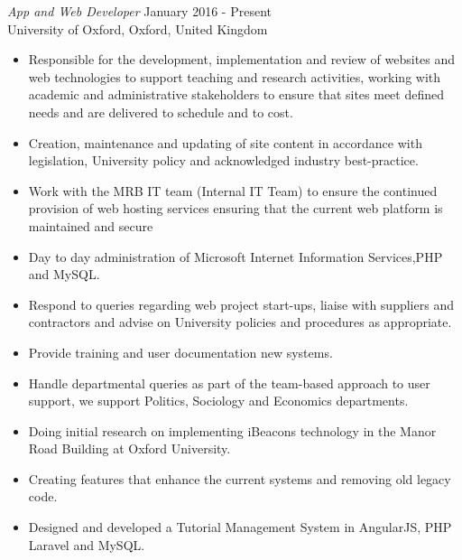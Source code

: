 \documentclass[margin, 10pt]{res} %
\begin{document}
\begin{resume}
{\sl App and Web Developer} \hfill January 2016 - Present \\
University of Oxford, Oxford, United Kingdom
\vspace{5mm} %
\begin{itemize} \itemsep -2pt %
\item Responsible for the development, implementation and review of websites and web technologies to support teaching and research activities, working with academic and administrative stakeholders to ensure that sites meet defined needs and are delivered to schedule and to cost.
\item Creation, maintenance and updating of site content in accordance with legislation, University policy and acknowledged industry best-practice.
\item Work with the MRB IT team (Internal IT Team) to ensure the continued provision of web hosting services ensuring that the current web platform is maintained and secure
\item Day to day administration of Microsoft Internet Information Services,PHP and MySQL.
\item Respond to queries regarding web project start-ups, liaise with suppliers and contractors and advise on University policies and procedures as appropriate.
\item Provide training and user documentation new systems.
\item Handle departmental queries as part of the team-based approach to user support, we support Politics, Sociology and Economics departments.
\item Doing initial research on implementing iBeacons technology in the Manor Road Building at Oxford University.
\item Creating features that enhance the current systems and removing old legacy code.
\item Designed and developed a Tutorial Management System in AngularJS, PHP Laravel and MySQL.

\end{itemize} 


\end{resume}
\end{document}
